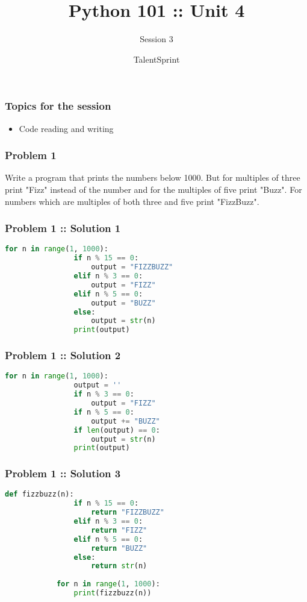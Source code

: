 \documentclass[14pt]{beamer}
\title{Python 101 :: Unit 4}
\subtitle{Session 3}
\date{}
\author[TS]{TalentSprint}
\begin{document}
    \begin{frame}
        \titlepage
    \end{frame}
    \begin{frame}
        \frametitle{Topics for the session}
        \begin{itemize}
            \item Code reading and writing
        \end{itemize}
    \end{frame}
    \begin{frame}
        \frametitle{Problem 1}
        \alert{Write a program that prints the numbers below 1000. But for multiples of three print "Fizz" instead of the number and for the multiples of five print "Buzz". For numbers which are multiples of both three and five print "FizzBuzz".}
    \end{frame}
    \begin{frame}[containsverbatim]
        \frametitle{Problem 1 :: Solution 1}
        \begin{lstlisting}[language=Python]
            for n in range(1, 1000):
                if n % 15 == 0:
                    output = "FIZZBUZZ"
                elif n % 3 == 0:
                    output = "FIZZ"
                elif n % 5 == 0:
                    output = "BUZZ"
                else:
                    output = str(n)
                print(output)
        \end{lstlisting}
    \end{frame}
    \begin{frame}[containsverbatim]
        \frametitle{Problem 1 :: Solution 2}
        \begin{lstlisting}[language=Python]
            for n in range(1, 1000):
                output = ''
                if n % 3 == 0:
                    output = "FIZZ"
                if n % 5 == 0:
                    output += "BUZZ"
                if len(output) == 0:
                    output = str(n)
                print(output)
        \end{lstlisting}
    \end{frame}
    \begin{frame}[containsverbatim]
        \frametitle{Problem 1 :: Solution 3}
        \begin{lstlisting}[language=Python]
            def fizzbuzz(n):    
                if n % 15 == 0:
                    return "FIZZBUZZ"
                elif n % 3 == 0:
                    return "FIZZ"
                elif n % 5 == 0:
                    return "BUZZ"
                else:
                    return str(n)
            
            for n in range(1, 1000):
                print(fizzbuzz(n))
        \end{lstlisting}
    \end{frame}
\end{document}
